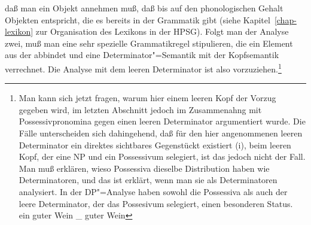 daß man ein Objekt annehmen muß, daß bis auf den phonologischen Gehalt Objekten entspricht, die es
bereits in der Grammatik gibt (siehe Kapitel~\ref{chap-lexikon} zur Organisation des Lexikons in der
HPSG). Folgt man der Analyse zwei, muß man eine sehr spezielle Grammatikregel stipulieren, die ein
Element aus der \sprl abbindet und eine Determinator"=Semantik mit der Kopfsemantik verrechnet. Die
Analyse mit dem leeren Determinator ist also vorzuziehen.\footnote{
  Man kann sich jetzt fragen, warum hier einem leeren Kopf der Vorzug gegeben wird, im letzten
  Abschnitt jedoch im Zusammenahng mit Possessivpronomina gegen einen leeren Determinator
  argumentiert wurde. Die Fälle unterscheiden sich dahingehend, daß für den hier angenommenen leeren
  Determinator ein direktes sichtbares Gegenstückt existiert (i), beim leeren Kopf, der eine NP und
  ein Possessivum selegiert, ist das jedoch nicht der Fall. Man muß erklären, wieso Possessiva
  dieselbe Distribution haben wie Determinatoren, und das ist erklärt, wenn man sie als
  Determinatoren analysiert. In der DP"=Analyse haben sowohl die Possessiva als auch der leere
  Determinator, der das Possesivum selegiert, einen besonderen Status.
\eal
\ex ein guter Wein
\ex \_ guter Wein
\zllast
}


